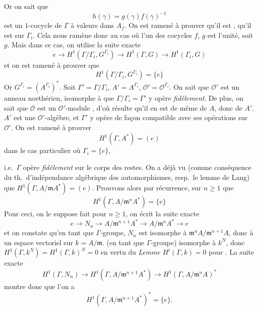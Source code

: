 \documentclass[11pt,a4paper]{article}
\begin{document}

Or on sait que
\[
  h(\gamma) = g(\gamma) f(\gamma)^{-1}
\]
est un $1$-cocycle de $\Gamma$ à valeurs dans $A_f$.
On est ramené à prouver qu'il est  , 
qu'il est   sur $\Gamma_i$.
Cela nous ramène donc au cas où l'un des cocycles $f$, $g$ est l'unité,
soit $g$. Mais dans ce cas, on utilise la suite exacte
\[
  e \longrightarrow H^1(\Gamma/\Gamma_i, G^{\Gamma_i}) \longrightarrow
  H^1(\Gamma, G) \longrightarrow H^1(\Gamma_i, G)
\]
et on est ramené à prouver que
\[
  H^1(\Gamma/\Gamma_i, G^{\Gamma_i}) = \lbrace e \rbrace
\]
Or $G^{\Gamma_i} = (A^{\Gamma_i})^{*}$. Soit $\Gamma' = \Gamma/\Gamma_i$,
$A' = A^{\Gamma_i}$,  $\mathcal{O}' = \mathcal{O}^{\Gamma_i}$.
On sait que $\mathcal{O}'$ est un anneau  noethérien,  isomorphe à  que
$\Gamma/\Gamma_i = \Gamma'$ y opère \emph{fidèlement}. De plus, on sait que
$\mathcal{O}$ est un $\mathcal{O}'$-module , d'où
résulte qu'il en est de même de $A$, donc de $A'$. $A'$ est une
$\mathcal{O}'$-algèbre, et $\Gamma'$ y opère de façon compatible avec ses
opérations sur $\mathcal{O}'$. On est ramené à prouver
\[
  H^1(\Gamma, A^{*}) = (e)
\]
\struck{\ill{}} dans le cas particulier où $\Gamma_i = \lbrace e \rbrace$,


i.e.\ $\Gamma$ opère \emph{fidèlement} sur le corps des restes. On a déjà vu
(comme conséquence du th.\ d'indépendance algébrique des automorphismes,
resp.\ le lemme de Lang) que $H^1(\Gamma, A/\mathfrak{m}A^{*}) = (e)$.
Prouvons alors par récurrence, sur $n \geq 1$ que
\[
  H^1(\Gamma, A/\mathfrak{m}^n A^{*}) = \lbrace e \rbrace
\]
Pour ceci, on  le suppose fait pour $n \geq 1$, on écrit la
suite exacte
\[
  e \longrightarrow N_n \longrightarrow A/\mathfrak{m}^{n+1}A^{*}
  \longrightarrow A/\mathfrak{m}^{n}A^{*} \longrightarrow e
\]
et on constate qu'en tant que $\Gamma$-groupe, $N_n$ est isomorphe à
$\mathfrak{m}^{n}A/\mathfrak{m}^{n+1}A$, donc à un espace vectoriel sur
$k = A/\mathfrak{m}$.  (en tant que $\Gamma$-groupe)
isomorphe à $k^N$, donc $H^1(\Gamma, k^N) = H^1(\Gamma, k)^N = 0$ en vertu du
\emph{Lemme} $H^i(\Gamma, k) = 0$ pour .
La suite exacte
\[
  H^1(\Gamma, N_n) \longrightarrow H^1(\Gamma, A/\mathfrak{m}^{n+1}A^{*})
  \longrightarrow H^1(\Gamma, A/\mathfrak{m}^{n}A)^{*}
\]
montre donc que l'on a
\[
  H^1(\Gamma, A/\mathfrak{m}^{n+1}A^{*})^{*} = \lbrace e \rbrace .
\]
\end{document}

